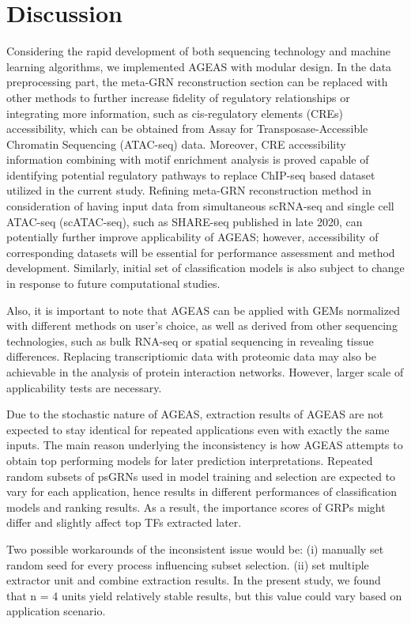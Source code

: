 \documentclass[fleqn,10pt]{wlscirep}
\begin{document}
\section*{Discussion}
  \label{disc}
  Considering the rapid development of both sequencing technology and machine learning algorithms, we implemented AGEAS with modular design.
  In the data preprocessing part, the meta-GRN reconstruction section can be replaced with other methods to further increase fidelity of regulatory relationships or integrating more information, such as cis-regulatory elements (CREs) accessibility, which can be obtained from Assay for Transposase-Accessible Chromatin Sequencing (ATAC-seq) data.
  Moreover, CRE accessibility information combining with motif enrichment analysis is proved capable of identifying potential regulatory pathways to replace ChIP-seq based dataset utilized in the current study. \cite{scREMOTE}
  Refining meta-GRN reconstruction method in consideration of having input data from simultaneous scRNA-seq and single cell ATAC-seq (scATAC-seq), such as SHARE-seq published in late 2020, \cite{share_seq} can potentially further improve applicability of AGEAS; however, accessibility of corresponding datasets will be essential for performance assessment and method development.
  Similarly, initial set of classification models is also subject to change in response to future computational studies.

  Also, it is important to note that AGEAS can be applied with GEMs normalized with different methods on user's choice, as well as derived from other sequencing technologies, such as bulk RNA-seq or spatial sequencing in revealing tissue differences.
  Replacing transcriptiomic data with proteomic data may also be achievable in the analysis of protein interaction networks.
  However, larger scale of applicability tests are necessary.

  Due to the stochastic nature of AGEAS, extraction results of AGEAS are not expected to stay identical for repeated applications even with exactly the same inputs.
  The main reason underlying the inconsistency is how AGEAS attempts to obtain top performing models for later prediction interpretations.
  Repeated random subsets of psGRNs used in model training and selection are expected to vary for each application, hence results in different performances of classification models and ranking results.
  As a result, the importance scores of GRPs might differ and slightly affect top TFs extracted later.

  Two possible workarounds of the inconsistent issue would be:
  (i) manually set random seed for every process influencing subset selection.
  (ii) set multiple extractor unit and combine extraction results.
  In the present study, we found that n = 4 units yield relatively stable results, but this value could vary based on application scenario.
\end{document}

